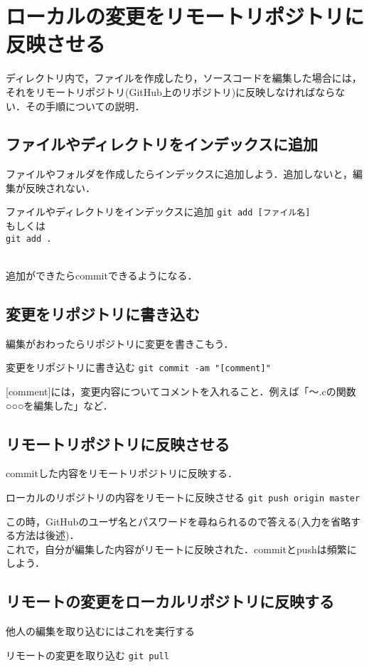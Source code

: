 \documentclass{jarticle}
\begin{document}
\section{ローカルの変更をリモートリポジトリに反映させる}
ディレクトリ内で，ファイルを作成したり，ソースコードを編集した場合には，それをリモートリポジトリ(GitHub上のリポジトリ)に反映しなければならない．その手順についての説明．
\subsection{ファイルやディレクトリをインデックスに追加}
ファイルやフォルダを作成したらインデックスに追加しよう．追加しないと，編集が反映されない．
\begin{itembox}[l]{ファイルやディレクトリをインデックスに追加}
{\tt git add [ファイル名]}\\
もしくは\\
{\tt git add .}
\end{itembox}
\\
追加ができたらcommitできるようになる．
\\
\subsection{変更をリポジトリに書き込む}
編集がおわったらリポジトリに変更を書きこもう．\\
\begin{itembox}[l]{変更をリポジトリに書き込む}
  {\tt git commit -am "[comment]"}
\end{itembox}
[comment]には，変更内容についてコメントを入れること．例えば「〜.cの関数○○○を編集した」など．
\\
%
\subsection{リモートリポジトリに反映させる}
commitした内容をリモートリポジトリに反映する．\\
\begin{itembox}[l]{ローカルのリポジトリの内容をリモートに反映させる}
  {\tt git push origin master}
\end{itembox}
この時，GitHubのユーザ名とパスワードを尋ねられるので答える(入力を省略する方法は後述)．\\
これで，自分が編集した内容がリモートに反映された．commitとpushは頻繁にしよう．
%
\subsection{リモートの変更をローカルリポジトリに反映する}
他人の編集を取り込むにはこれを実行する\\
\begin{itembox}[l]{リモートの変更を取り込む}
{\tt git pull}
\end{itembox}
%
\end{document}
